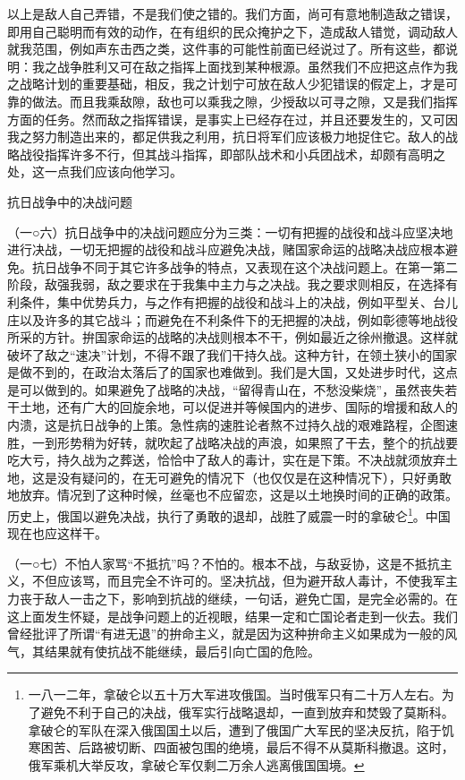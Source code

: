 \documentclass[UTF8, 12pt, a4paper]{ctexrep}
\begin{document}
以上是敌人自己弄错，不是我们使之错的。我们方面，尚可有意地制造敌之错误，即用自己聪明而有效的动作，在有组织的民众掩护之下，造成敌人错觉，调动敌人就我范围，例如声东击西之类，这件事的可能性前面已经说过了。所有这些，都说明：我之战争胜利又可在敌之指挥上面找到某种根源。虽然我们不应把这点作为我之战略计划的重要基础，相反，我之计划宁可放在敌人少犯错误的假定上，才是可靠的做法。而且我乘敌隙，敌也可以乘我之隙，少授敌以可寻之隙，又是我们指挥方面的任务。然而敌之指挥错误，是事实上已经存在过，并且还要发生的，又可因我之努力制造出来的，都足供我之利用，抗日将军们应该极力地捉住它。敌人的战略战役指挥许多不行，但其战斗指挥，即部队战术和小兵团战术，却颇有高明之处，这一点我们应该向他学习。

抗日战争中的决战问题

（一○六）抗日战争中的决战问题应分为三类：一切有把握的战役和战斗应坚决地进行决战，一切无把握的战役和战斗应避免决战，赌国家命运的战略决战应根本避免。抗日战争不同于其它许多战争的特点，又表现在这个决战问题上。在第一第二阶段，敌强我弱，敌之要求在于我集中主力与之决战。我之要求则相反，在选择有利条件，集中优势兵力，与之作有把握的战役和战斗上的决战，例如平型关、台儿庄以及许多的其它战斗；而避免在不利条件下的无把握的决战，例如彰德等地战役所采的方针。拚国家命运的战略的决战则根本不干，例如最近之徐州撤退。这样就破坏了敌之“速决”计划，不得不跟了我们干持久战。这种方针，在领土狭小的国家是做不到的，在政治太落后了的国家也难做到。我们是大国，又处进步时代，这点是可以做到的。如果避免了战略的决战，“留得青山在，不愁没柴烧”，虽然丧失若干土地，还有广大的回旋余地，可以促进并等候国内的进步、国际的增援和敌人的内溃，这是抗日战争的上策。急性病的速胜论者熬不过持久战的艰难路程，企图速胜，一到形势稍为好转，就吹起了战略决战的声浪，如果照了干去，整个的抗战要吃大亏，持久战为之葬送，恰恰中了敌人的毒计，实在是下策。不决战就须放弃土地，这是没有疑问的，在无可避免的情况下（也仅仅是在这种情况下），只好勇敢地放弃。情况到了这种时候，丝毫也不应留恋，这是以土地换时间的正确的政策。历史上，俄国以避免决战，执行了勇敢的退却，战胜了威震一时的拿破仑\footnote{一八一二年，拿破仑以五十万大军进攻俄国。当时俄军只有二十万人左右。为了避免不利于自己的决战，俄军实行战略退却，一直到放弃和焚毁了莫斯科。拿破仑的军队在深入俄国国土以后，遭到了俄国广大军民的坚决反抗，陷于饥寒困苦、后路被切断、四面被包围的绝境，最后不得不从莫斯科撤退。这时，俄军乘机大举反攻，拿破仑军仅剩二万余人逃离俄国国境。}。中国现在也应这样干。

（一○七）不怕人家骂“不抵抗”吗？不怕的。根本不战，与敌妥协，这是不抵抗主义，不但应该骂，而且完全不许可的。坚决抗战，但为避开敌人毒计，不使我军主力丧于敌人一击之下，影响到抗战的继续，一句话，避免亡国，是完全必需的。在这上面发生怀疑，是战争问题上的近视眼，结果一定和亡国论者走到一伙去。我们曾经批评了所谓“有进无退”的拚命主义，就是因为这种拚命主义如果成为一般的风气，其结果就有使抗战不能继续，最后引向亡国的危险。
\end{document}
